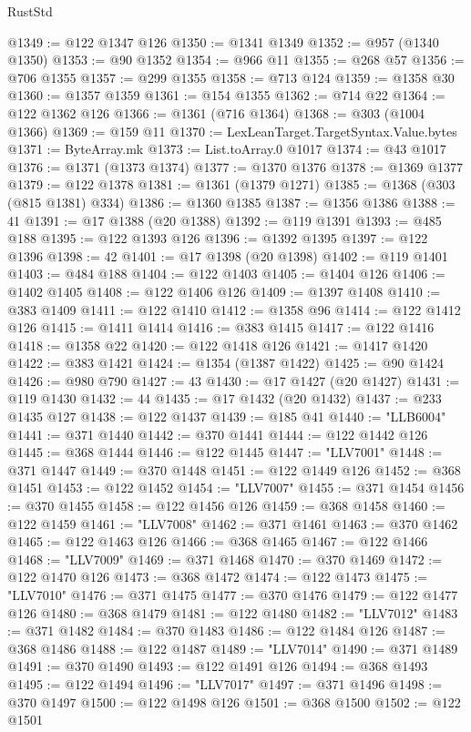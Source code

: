 \begin{lexlean}{RustStd}
\begin{coremodule}
{\begin{coremodule}
{{{{{{{{{{{{{{{{{{{{{{{{{{{{{{{{{{{{{{{{{{{{{{{{{{{{{{{{{{{{{{{{{{{{@1349 := @122 @1347 @126
@1350 := @1341 @1349
@1352 := @957 (@1340 @1350)
@1353 := @90 @1352
@1354 := @966 @11
@1355 := @268 @57
@1356 := @706 @1355
@1357 := @299 @1355
@1358 := @713 @124
@1359 := @1358 @30
@1360 := @1357 @1359
@1361 := @154 @1355
@1362 := @714 @22
@1364 := @122 @1362 @126
@1366 := @1361 (@716 @1364)
@1368 := @303 (@1004 @1366)
@1369 := @159 @11
@1370 := LexLeanTarget.TargetSyntax.Value.bytes
@1371 := ByteArray.mk
@1373 := List.toArray.{0} @1017
@1374 := @43 @1017
@1376 := @1371 (@1373 @1374)
@1377 := @1370 @1376
@1378 := @1369 @1377
@1379 := @122 @1378
@1381 := @1361 (@1379 @1271)
@1385 := @1368 (@303 (@815 @1381) @334)
@1386 := @1360 @1385
@1387 := @1356 @1386
@1388 := 41
@1391 := @17 @1388 (@20 @1388)
@1392 := @119 @1391
@1393 := @485 @188
@1395 := @122 @1393 @126
@1396 := @1392 @1395
@1397 := @122 @1396
@1398 := 42
@1401 := @17 @1398 (@20 @1398)
@1402 := @119 @1401
@1403 := @484 @188
@1404 := @122 @1403
@1405 := @1404 @126
@1406 := @1402 @1405
@1408 := @122 @1406 @126
@1409 := @1397 @1408
@1410 := @383 @1409
@1411 := @122 @1410
@1412 := @1358 @96
@1414 := @122 @1412 @126
@1415 := @1411 @1414
@1416 := @383 @1415
@1417 := @122 @1416
@1418 := @1358 @22
@1420 := @122 @1418 @126
@1421 := @1417 @1420
@1422 := @383 @1421
@1424 := @1354 (@1387 @1422)
@1425 := @90 @1424
@1426 := @980 @790
@1427 := 43
@1430 := @17 @1427 (@20 @1427)
@1431 := @119 @1430
@1432 := 44
@1435 := @17 @1432 (@20 @1432)
@1437 := @233 @1435 @127
@1438 := @122 @1437
@1439 := @185 @41
@1440 := "LLB6004"
@1441 := @371 @1440
@1442 := @370 @1441
@1444 := @122 @1442 @126
@1445 := @368 @1444
@1446 := @122 @1445
@1447 := "LLV7001"
@1448 := @371 @1447
@1449 := @370 @1448
@1451 := @122 @1449 @126
@1452 := @368 @1451
@1453 := @122 @1452
@1454 := "LLV7007"
@1455 := @371 @1454
@1456 := @370 @1455
@1458 := @122 @1456 @126
@1459 := @368 @1458
@1460 := @122 @1459
@1461 := "LLV7008"
@1462 := @371 @1461
@1463 := @370 @1462
@1465 := @122 @1463 @126
@1466 := @368 @1465
@1467 := @122 @1466
@1468 := "LLV7009"
@1469 := @371 @1468
@1470 := @370 @1469
@1472 := @122 @1470 @126
@1473 := @368 @1472
@1474 := @122 @1473
@1475 := "LLV7010"
@1476 := @371 @1475
@1477 := @370 @1476
@1479 := @122 @1477 @126
@1480 := @368 @1479
@1481 := @122 @1480
@1482 := "LLV7012"
@1483 := @371 @1482
@1484 := @370 @1483
@1486 := @122 @1484 @126
@1487 := @368 @1486
@1488 := @122 @1487
@1489 := "LLV7014"
@1490 := @371 @1489
@1491 := @370 @1490
@1493 := @122 @1491 @126
@1494 := @368 @1493
@1495 := @122 @1494
@1496 := "LLV7017"
@1497 := @371 @1496
@1498 := @370 @1497
@1500 := @122 @1498 @126
@1501 := @368 @1500
@1502 := @122 @1501
}}}}}}}}}}}}}}}}}}}}}}}}}}}}}}}}}}}}}}}}}}}}}}}}}}}}}}}}}}}}}}}}}}}}
\end{coremodule}}
\end{coremodule}
\end{lexlean}
